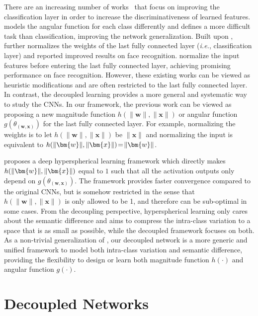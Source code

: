 There are an increasing number of works~\cite{wang2018additive,ranjan2017l2,liu2017sphereface,liu2016large,liu2017rethinking,wang2017normface,yuan2017feature,jones2017improving} that focus on improving the classification layer in order to increase the discriminativeness of learned features. \cite{liu2016large} models the angular function for each class differently and defines a more difficult task than classification, improving the network generalization. Built upon \cite{liu2016large}, \cite{liu2017sphereface} further normalizes the weights of the last fully connected layer (\emph{i.e.}, classification layer) and reported improved results on face recognition. \cite{wang2018additive,ranjan2017l2,wang2017normface} normalize the input features before entering the last fully connected layer, achieving promising performance on face recognition. However, these existing works can be viewed as heuristic modifications and are often restricted to the last fully connected layer. In contrast, the decoupled learning provides a more general and systematic way to study the CNNs. In our framework, the previous work can be viewed as proposing a new magnitude function $h(\|\bm{w}\|,\|\bm{x}\|)$ or angular function $g(\theta_{(\bm{w},\bm{x})})$ for the last fully connected layer. For example, normalizing the weights is to let $h(\|\bm{w}\|,\|\bm{x}\|)$ be $\|\bm{x}\|$ and normalizing the input is equivalent to $\thickmuskip=2mu \medmuskip=2mu h(\|\bm{w}\|,\|\bm{x}\|)=\|\bm{w}\|$.
\par
\cite{liu2017deephyper} proposes a deep hyperspherical learning framework which directly makes $\thickmuskip=2mu \medmuskip=2mu h(\|\bm{w}\|,\|\bm{x}\|)$ equal to $1$ such that all the activation outputs only depend on $g(\theta_{(\bm{w},\bm{x})})$. The framework provides faster convergence compared to the original CNNs, but is somehow restricted in the sense that $h(\|\bm{w}\|,\|\bm{x}\|)$ is only allowed to be 1, and therefore can be sub-optimal in some cases. From the decoupling perspective, hyperspherical learning only cares about the semantic difference and aims to compress the intra-class variation to a space that is as small as possible, while the decoupled framework focuses on both. As a non-trivial generalization of \cite{liu2017deephyper}, our decoupled network is a more generic and unified framework to model both intra-class variation and semantic difference, providing the flexibility to design or learn both magnitude function $h(\cdot)$ and angular function $g(\cdot)$.

\section{Decoupled Networks}


